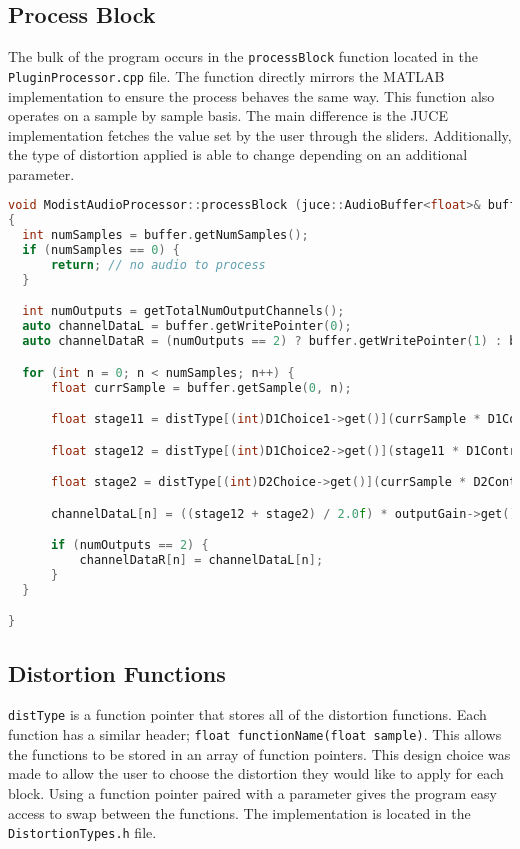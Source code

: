 \documentclass{article}
\begin{document}
\subsection{Process Block}
The bulk of the program occurs in the \lstinline{processBlock} function located
in the \lstinline{PluginProcessor.cpp} file. The function directly mirrors the
MATLAB implementation to ensure the process behaves the same way. This function also
operates on a sample by sample basis. The main difference
is the JUCE implementation fetches the value set by the user through the sliders. Additionally, the
type of distortion applied is able to change depending on an additional parameter.

\begin{lstlisting}[language=C++]
void ModistAudioProcessor::processBlock (juce::AudioBuffer<float>& buffer, juce::MidiBuffer& midiMessages)
{
  int numSamples = buffer.getNumSamples();
  if (numSamples == 0) {
      return; // no audio to process
  }

  int numOutputs = getTotalNumOutputChannels();
  auto channelDataL = buffer.getWritePointer(0);
  auto channelDataR = (numOutputs == 2) ? buffer.getWritePointer(1) : buffer.getWritePointer(0);

  for (int n = 0; n < numSamples; n++) {
      float currSample = buffer.getSample(0, n);

      float stage11 = distType[(int)D1Choice1->get()](currSample * D1Control1->get());

      float stage12 = distType[(int)D1Choice2->get()](stage11 * D1Control2->get());

      float stage2 = distType[(int)D2Choice->get()](currSample * D2Control->get());

      channelDataL[n] = ((stage12 + stage2) / 2.0f) * outputGain->get();

      if (numOutputs == 2) {
          channelDataR[n] = channelDataL[n];
      }
  }

}
\end{lstlisting}

\subsection{Distortion Functions}
\lstinline{distType}
is a function pointer that stores all of the distortion functions.
Each function has a similar header; \lstinline{float functionName(float sample)}.
This allows the functions to be stored in an array of function pointers. This design
choice was made to allow the user to choose the distortion they would like to apply for
each block. Using a function pointer paired with a parameter gives the program easy access
to swap between the functions. The implementation is located in the \lstinline{DistortionTypes.h}
file.
\end{document}
